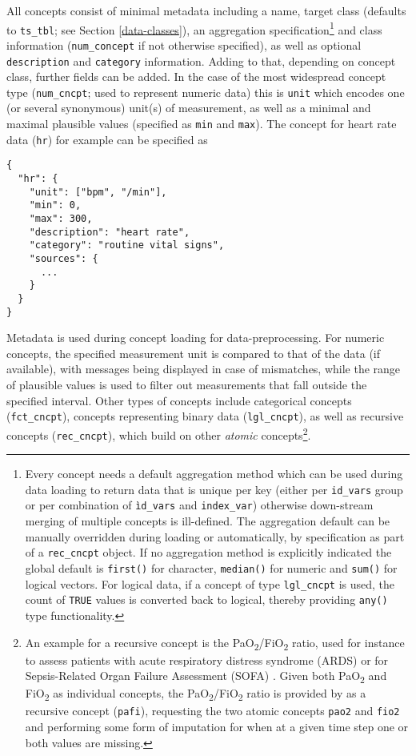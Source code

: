 \documentclass[
  notitle]{jss}
\begin{document}
All concepts consist of minimal metadata including a name, target class
(defaults to \texttt{ts\_tbl}; see Section \ref{data-classes}), an
aggregation specification\footnote{Every concept needs a default
  aggregation method which can be used during data loading to return
  data that is unique per key (either per \texttt{id\_vars} group or per
  combination of \texttt{ìd\_vars} and \texttt{index\_var}) otherwise
  down-stream merging of multiple concepts is ill-defined. The
  aggregation default can be manually overridden during loading or
  automatically, by specification as part of a \texttt{rec\_cncpt}
  object. If no aggregation method is explicitly indicated the global
  default is \texttt{first()} for character, \texttt{median()} for
  numeric and \texttt{sum()} for logical vectors. For logical data, if a
  concept of type \texttt{lgl\_cncpt} is used, the count of
  \texttt{TRUE} values is converted back to logical, thereby providing
  \texttt{any()} type functionality.} and class information
(\texttt{num\_concept} if not otherwise specified), as well as optional
\texttt{description} and \texttt{category} information. Adding to that,
depending on concept class, further fields can be added. In the case of
the most widespread concept type (\texttt{num\_cncpt}; used to represent
numeric data) this is \texttt{unit} which encodes one (or several
synonymous) unit(s) of measurement, as well as a minimal and maximal
plausible values (specified as \texttt{min} and \texttt{max}). The
concept for heart rate data (\texttt{hr}) for example can be specified
as

\begin{verbatim}
{
  "hr": {
    "unit": ["bpm", "/min"],
    "min": 0,
    "max": 300,
    "description": "heart rate",
    "category": "routine vital signs",
    "sources": {
      ...
    }
  }
}
\end{verbatim}

Metadata is used during concept loading for data-preprocessing. For
numeric concepts, the specified measurement unit is compared to that of
the data (if available), with messages being displayed in case of
mismatches, while the range of plausible values is used to filter out
measurements that fall outside the specified interval. Other types of
concepts include categorical concepts (\texttt{fct\_cncpt}), concepts
representing binary data (\texttt{lgl\_cncpt}), as well as recursive
concepts (\texttt{rec\_cncpt}), which build on other \emph{atomic}
concepts\footnote{An example for a recursive concept is the
  PaO\textsubscript{2}/FiO\textsubscript{2} ratio, used for instance to
  assess patients with acute respiratory distress syndrome (ARDS) or for
  Sepsis-Related Organ Failure Assessment (SOFA)
  \citep{villar2013, vincent1996}. Given both PaO\textsubscript{2} and
  FiO\textsubscript{2} as individual concepts, the
  PaO\textsubscript{2}/FiO\textsubscript{2} ratio is provided by
   as a recursive concept (\texttt{pafi}), requesting the two
  atomic concepts \texttt{pao2} and \texttt{fio2} and performing some
  form of imputation for when at a given time step one or both values
  are missing.}.
\end{document}
